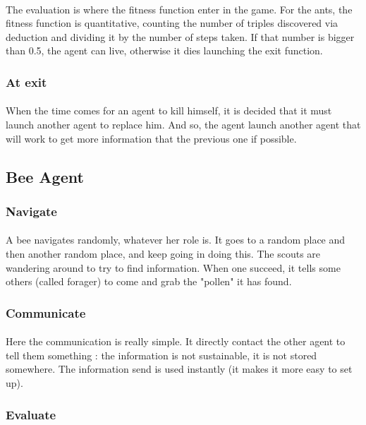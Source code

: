 \documentclass{article}
\begin{document}
			\paragraph{}
			The evaluation is where the fitness function enter in the game.
			For the ants, the fitness function is quantitative,
			counting the number of triples discovered via deduction and dividing it by the number of steps taken.
			If that number is bigger than 0.5, the agent can live, otherwise it dies launching the exit function.
		\subsubsection{At exit}
			\paragraph{}
			When the time comes for an agent to kill himself, it is decided that it must launch another agent to replace him.
			And so, the agent launch another agent that will work to get more information that the previous one if possible.
	\subsection{Bee Agent}
		\subsubsection{Navigate}
			\paragraph{}
			A bee navigates randomly, whatever her role is.
			It goes to a random place and then another random place, and keep going in doing this.
			The scouts are wandering around to try to find information.
			When one succeed, it tells some others (called forager) to come and grab the "pollen" it has found.
		\subsubsection{Communicate}
			\paragraph{}
			Here the communication is really simple.
			It directly contact the other agent to tell them something : the information is not sustainable, it is not stored somewhere.
			The information send is used instantly (it makes it more easy to set up).
		\subsubsection{Evaluate}
\end{document}
